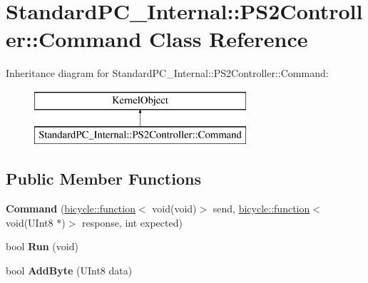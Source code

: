 \hypertarget{class_standard_p_c___internal_1_1_p_s2_controller_1_1_command}{}\section{Standard\+P\+C\+\_\+\+Internal\+:\+:P\+S2\+Controller\+:\+:Command Class Reference}
\label{class_standard_p_c___internal_1_1_p_s2_controller_1_1_command}
Inheritance diagram for Standard\+P\+C\+\_\+\+Internal\+:\+:P\+S2\+Controller\+:\+:Command\+:\begin{figure}[H]
\begin{center}
\leavevmode
\includegraphics[height=2.000000cm]{class_standard_p_c___internal_1_1_p_s2_controller_1_1_command}
\end{center}
\end{figure}
\subsection*{Public Member Functions}
\begin{DoxyCompactItemize}
\item 
\mbox{\label{class_standard_p_c___internal_1_1_p_s2_controller_1_1_command_a18271c7299d70aa610db684e733c8a31}} 
{\bfseries Command} (\hyperlink{classbicycle_1_1function}{bicycle\+::function}$<$ void(void)$>$ send, \hyperlink{classbicycle_1_1function}{bicycle\+::function}$<$ void(U\+Int8 $\ast$)$>$ response, int expected)
\item 
\mbox{\label{class_standard_p_c___internal_1_1_p_s2_controller_1_1_command_a42fd7dfa5ed34eb37cb2f9b0c45bc111}} 
bool {\bfseries Run} (void)
\item 
\mbox{\label{class_standard_p_c___internal_1_1_p_s2_controller_1_1_command_ab35156844379c7bdd154ca39535b11eb}} 
bool {\bfseries Add\+Byte} (U\+Int8 data)
\end{DoxyCompactItemize}

